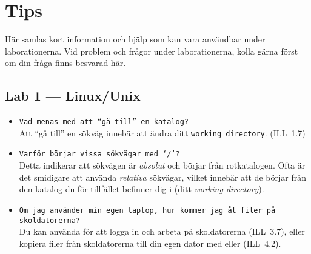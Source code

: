 \documentclass[fleqn, article, a4paper]{memoir}
\begin{document}
\newpage
\section{Tips}
\label{sec:tips}

Här samlas kort information och hjälp som kan vara användbar under laborationerna. Vid problem och frågor under laborationerna, kolla gärna först om din fråga finns besvarad här.

\subsection{Lab 1 --- Linux/Unix}
\begin{itemize}
    \item \texttt{Vad menas med att \enquote{gå till} en katalog?}\\
          Att \enquote{gå till} en sökväg innebär att ändra ditt \texttt{working directory}. (ILL~1.7)

    \item \texttt{Varför börjar vissa sökvägar med \enquote*{/}?}\\
          Detta indikerar att sökvägen är \emph{absolut} och börjar från rotkatalogen. Ofta är det smidigare att använda \emph{relativa} sökvägar, vilket innebär att de börjar från den katalog du för tillfället befinner dig i (ditt \emph{working directory}).

    \item \texttt{Om jag använder min egen laptop, hur kommer jag åt filer på skoldatorerna?}\\
          Du kan använda  för att logga in och arbeta på skoldatorerna (ILL~3.7), eller kopiera filer från skoldatorerna till din egen dator med  eller  (ILL~4.2).
\end{itemize}
\end{document}
